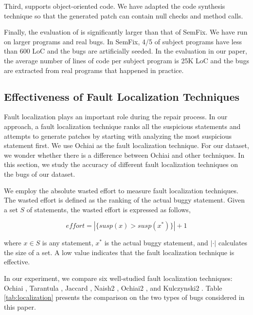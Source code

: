 Third, \nopol supports object-oriented code. We have adapted the code synthesis technique so that the generated patch can contain null checks and method calls. 

Finally, the evaluation of \nopol is significantly larger than that of SemFix. We have run \nopol on larger programs and real bugs. In SemFix, 4/5 of subject programs have less than 600 LoC and the bugs are artificially seeded. In the evaluation in our paper, the average number of lines of code per subject program is 25K LoC and the bugs are extracted from real programs that happened in practice. 

\subsection{Effectiveness of Fault Localization Techniques}
\label{subsect:discussion-fault}

Fault localization plays an important role during the repair process. In our approach, a fault localization technique ranks all the suspicious statements and \nopol attempts to generate patches by starting with analyzing the most suspicious statement first. 
We use Ochiai \cite{abreu2007accuracy} as the fault localization technique. 
For our dataset, we wonder whether there is a difference between Ochiai and other techniques. In this section, we study the accuracy of different fault localization techniques on the bugs of our dataset. 

We employ the absolute wasted effort to measure fault localization techniques. The wasted effort is defined as the ranking of the actual buggy statement. 
Given a set $S$ of statements, the wasted effort is expressed as follows, 

\vspace{-2ex}
$$effort=|\{susp(x)>susp(x^{*})\}|+1 $$
\vspace{-2ex}

\noindent where $x \in S$ is any statement, $x^{*}$ is the actual buggy statement, and $|\cdot|$ calculates the size of a set. A low value indicates that the fault localization technique is effective.    

In our experiment, we compare six well-studied fault localization techniques: Ochiai \cite{abreu2007accuracy}, Tarantula \cite{jones2002visualization}, Jaccard \cite{abreu2007accuracy}, Naish2 \cite{naish2011model}, Ochiai2 \cite{naish2011model}, and Kulczynski2 \cite{xu2013general}. Table \ref{tab:localization} presents the comparison on the two types of bugs considered in this paper. 

